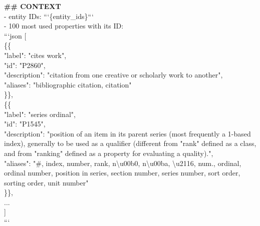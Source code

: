 {\begin{tcolorbox}[title=SPARQL Query Generation Prompt, colback=blue!5!white, colframe=blue!75!black, boxrule=0.5mm, arc=2mm, fontupper=\ttfamily, verbatim, breakable, before upper=\vspace{2mm}]
\textbf{\#\# CONTEXT} \\
- entity IDs: ```\{entity\_ids\}```\\
- 100 most used properties with its ID:\\
```json [\\
  \{\{\\
    "label": "cites work",\\
    "id": "P2860",\\
    "description": "citation from one creative or scholarly work to another",\\
    "aliases": "bibliographic citation, citation"\\
  \}\},\\
  \{\{\\
    "label": "series ordinal",\\
    "id": "P1545",\\
    "description": "position of an item in its parent series (most frequently a 1-based index), generally to be used as a qualifier (different from "rank" defined as a class, and from "ranking" defined as a property for evaluating a quality).",\\
    "aliases": "\#, index, number, rank, n\textbackslash u00b0, n\textbackslash u00ba, \textbackslash u2116, num., ordinal, ordinal number, position in series, section number, series number, sort order, sorting order, unit number"\\
  \}\},\\
  ...\\
]\\
```\\


\end{tcolorbox}}
